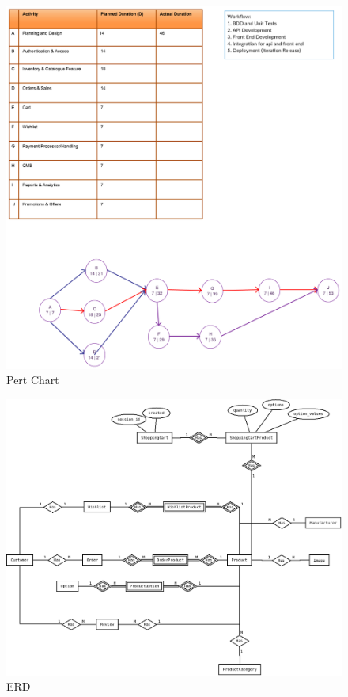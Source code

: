 \documentclass{report}
\begin{document}
\begin{figure}[h!]
\includegraphics[width=\linewidth]{Diagrams/PertChart.png}
\caption{Pert Chart}
\label{fig:PertChart}
\end{figure}

\begin{figure}[h!]
\includegraphics[width=\linewidth]{Diagrams/Entity-RelationshipDiagram.png}
\caption{ERD}
\label{fig:ERD}
\end{figure}
\end{document}
